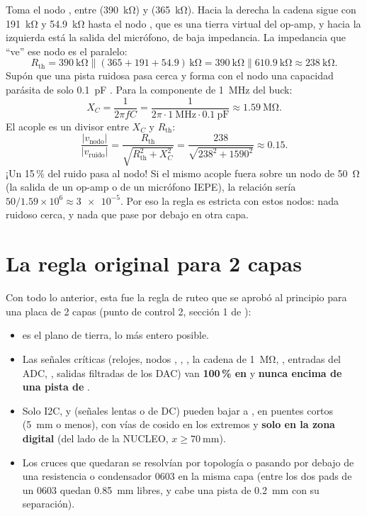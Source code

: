 \begin{calculo}
Toma el nodo , entre  (\SI{390}{\kilo\ohm}) y  (\SI{365}{\kilo\ohm}). Hacia
la derecha la cadena sigue con \SI{191}{\kilo\ohm} y \SI{54.9}{\kilo\ohm} hasta el nodo , que es una tierra
virtual del op-amp, y hacia la izquierda está la salida del micrófono, de baja impedancia. La impedancia que ``ve''
ese nodo es el paralelo:
\[
R_\text{th} = \SI{390}{\kilo\ohm} \parallel (\num{365}+\num{191}+\num{54.9})\,\si{\kilo\ohm}
= \SI{390}{\kilo\ohm} \parallel \SI{610.9}{\kilo\ohm} \approx \SI{238}{\kilo\ohm}.
\]
Supón que una pista ruidosa pasa cerca y forma con el nodo una capacidad parásita de solo \SI{0.1}{\pico\farad}
\estimado{}. Para la componente de \SI{1}{\mega\hertz} del buck:
\[
X_C = \frac{1}{2\pi f C} = \frac{1}{2\pi\cdot\SI{1}{\mega\hertz}\cdot\SI{0.1}{\pico\farad}} \approx \SI{1.59}{\mega\ohm}.
\]
El acople es un divisor entre $X_C$ y $R_\text{th}$:
\[
\frac{|v_\text{nodo}|}{|v_\text{ruido}|} = \frac{R_\text{th}}{\sqrt{R_\text{th}^2 + X_C^2}}
= \frac{238}{\sqrt{238^2+1590^2}} \approx \num{0.15}.
\]
¡Un 15\,\% del ruido pasa al nodo! Si el mismo acople fuera sobre un nodo de \SI{50}{\ohm} (la salida de un op-amp o
de un micrófono IEPE), la relación sería $50/1.59\times10^{6} \approx \num{3e-5}$. Por eso la regla es estricta con
estos nodos: nada ruidoso cerca, y nada que pase por debajo en otra capa.
\end{calculo}

\section{La regla original para 2 capas}\label{sec:c08-regla2}

Con todo lo anterior, esta fue la regla de ruteo que se aprobó al principio para una placa de 2 capas (punto de
control 2, sección 1 de ):

\begin{itemize}
  \item {} es el plano de tierra, lo más entero posible.
  \item Las señales críticas (relojes, nodos , , , la cadena de \SI{1}{\mega\ohm},
  , entradas del ADC, , salidas filtradas de los DAC) van \textbf{100\,\% en } y
  \textbf{nunca encima de una pista de }.
  \item Solo I2C,  y  (señales lentas o de DC) pueden bajar a , en puentes
  cortos (\SI{5}{\milli\meter} o menos), con vías de cosido en los extremos y \textbf{solo en la zona digital} (del
  lado de la NUCLEO, $x \geq \SI{70}{\milli\meter}$).
  \item Los cruces que quedaran se resolvían por topología o pasando por debajo de una resistencia o condensador 0603
  en la misma capa (entre los dos pads de un 0603 quedan \SI{0.85}{\milli\meter} libres, y cabe una pista de
  \SI{0.2}{\milli\meter} con su separación).
\end{itemize}

